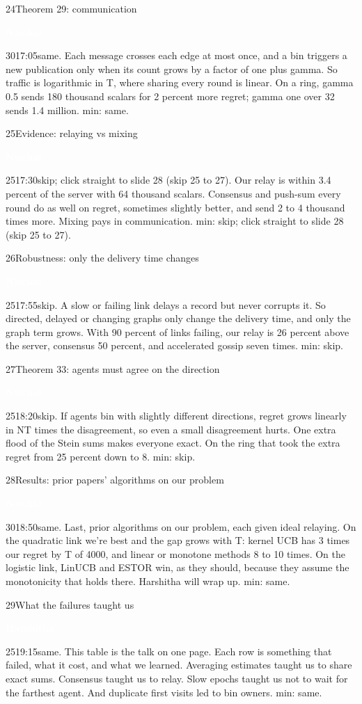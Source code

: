 \documentclass[12pt,a4paper]{article}
\newcommand{\Hb}{\colorbox{harsh}{\strut\textcolor{white}{\textbf{\small Harshitha}}}}
\newcommand{\Nb}{\colorbox{nisch}{\strut\textcolor{white}{\textbf{\small Nischal}}}}
\newenvironment{slide}[6]
  {\begin{slidebox}{#1}{#2}{#3}{#4}{#5}{#6}\gdef\fifteen{#6}}
  {\tcblower 15 min: \fifteen\end{slidebox}}
\begin{document}
\begin{slide}{24}{Theorem 29: communication}{\Nb}{30}{17:05}{same.}
Each message crosses each edge at most once, and a bin triggers a new publication only when its count grows by a factor
of one plus gamma. So traffic is logarithmic in T, where sharing every round is linear. On a ring, gamma 0.5 sends
180 thousand scalars for 2 percent more regret; gamma one over 32 sends 1.4 million.
\end{slide}

\begin{slide}{25}{Evidence: relaying vs mixing}{\Nb}{25}{17:30}{skip; click straight to slide 28 (skip 25 to 27).}
Our relay is within 3.4 percent of the server with 64 thousand scalars. Consensus and push-sum every round do as well
on regret, sometimes slightly better, and send 2 to 4 thousand times more. Mixing pays in communication.
\end{slide}

\begin{slide}{26}{Robustness: only the delivery time changes}{\Nb}{25}{17:55}{skip.}
A slow or failing link delays a record but never corrupts it. So directed, delayed or changing graphs only change the
delivery time, and only the graph term grows. With 90 percent of links failing, our relay is 26 percent above the
server, consensus 50 percent, and accelerated gossip seven times.
\end{slide}

\begin{slide}{27}{Theorem 33: agents must agree on the direction}{\Nb}{25}{18:20}{skip.}
If agents bin with slightly different directions, regret grows linearly in NT times the disagreement, so even a small
disagreement hurts. One extra flood of the Stein sums makes everyone exact. On the ring that took the extra regret
from 25 percent down to 8.
\end{slide}

\begin{slide}{28}{Results: prior papers' algorithms on our problem}{\Nb}{30}{18:50}{same.}
Last, prior algorithms on our problem, each given ideal relaying. On the quadratic link we're best and the gap grows
with T: kernel UCB has 3 times our regret by T of 4000, and linear or monotone methods 8 to 10 times. On the
logistic link, LinUCB and ESTOR win, as they should, because they assume the monotonicity that holds there. Harshitha
will wrap up.
\end{slide}

\begin{slide}{29}{What the failures taught us}{\Hb}{25}{19:15}{same.}
This table is the talk on one page. Each row is something that failed, what it cost, and what we learned. Averaging
estimates taught us to share exact sums. Consensus taught us to relay. Slow epochs taught us not to wait for the
farthest agent. And duplicate first visits led to bin owners.
\end{slide}
\end{document}
